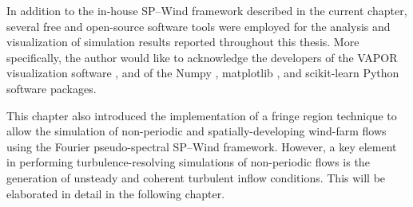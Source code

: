 In addition to the in-house SP--Wind framework described in the current chapter, several free and open-source software tools were employed for the analysis and visualization of simulation results reported throughout this thesis. More specifically, the author would like to acknowledge the developers of the VAPOR visualization software \citep{vapor}, and of the Numpy \citep{numpy}, matplotlib \citep{matplotlib}, and scikit-learn \citep{scikit-learn} Python software packages. 

This chapter also introduced the implementation of a fringe region technique to allow the simulation of non-periodic and spatially-developing wind-farm flows using the Fourier pseudo-spectral SP--Wind framework. However, a key element in performing turbulence-resolving simulations of non-periodic flows is the generation of unsteady and coherent turbulent inflow conditions. This will be elaborated in detail in the following chapter. 

\cleardoublepage

